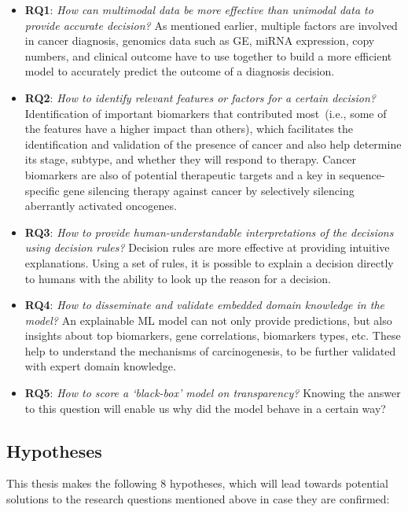 \vspace{-2mm}
\begin{itemize}[noitemsep]
    \item \textbf{RQ1}: \textit{How can multimodal data be more effective than unimodal data to provide accurate decision?} As mentioned earlier, multiple factors are involved in cancer diagnosis, genomics data such as GE, miRNA expression, copy numbers, and clinical outcome have to use together to build a more efficient model to accurately predict the outcome of a diagnosis decision.  
    \item \textbf{RQ2}: \textit{How to identify relevant features or factors for a certain decision?} Identification of important biomarkers that contributed most~(i.e., some of the features have a higher impact than others), which facilitates the identification and validation of the presence of cancer and also help determine its stage, subtype, and whether they will respond to therapy. Cancer biomarkers are also of potential therapeutic targets and a key in sequence-specific gene silencing therapy against cancer by selectively silencing aberrantly activated oncogenes.  
    \item \textbf{RQ3}: \textit{How to provide human-understandable interpretations of the decisions using decision rules?} Decision rules are more effective at providing intuitive explanations. Using a set of rules, it is possible to explain a decision directly to humans with the ability to look up the reason for a decision. 
    \item \textbf{RQ4}: \textit{How to disseminate and validate embedded domain knowledge in the model?} An explainable ML model can not only provide predictions, but also insights about top biomarkers, gene correlations, biomarkers types, etc. These help to understand the mechanisms of carcinogenesis, to be further validated with expert domain knowledge. 
    \item \textbf{RQ5}: \textit{How to score a `black-box' model on transparency?} Knowing the answer to this question will enable us why did the model behave in a certain way? 
\end{itemize}
\vspace{-2mm}

\subsection{Hypotheses}
This thesis makes the following 8 hypotheses, which will lead towards potential solutions to the research questions mentioned above in case they are confirmed:

